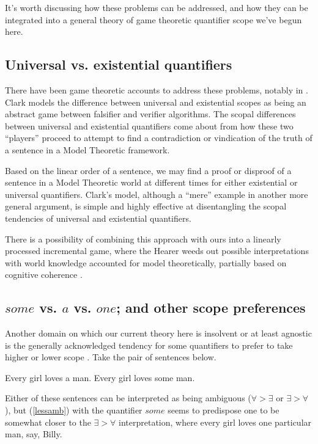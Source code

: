 \documentclass{article}
\begin{document}
It's worth discussing how these problems can be addressed, and how they can be integrated into a general theory of game theoretic quantifier scope we've begun here.

\subsection{Universal vs. existential quantifiers}

There have been game theoretic accounts to address these problems, notably in \textcite{clark12}.
Clark models the difference between universal and existential scopes as being an abstract game between falsifier and verifier algorithms.
The scopal differences between universal and existential quantifiers come about from how these two ``players'' proceed to attempt to find a contradiction or vindication of the truth of a sentence in a Model Theoretic framework.

Based on the linear order of a sentence, we may find a proof or disproof of a sentence in a Model Theoretic world at different times for either existential or universal quantifiers.
Clark's model, although a ``mere'' example in another more general argument, is simple and highly effective at disentangling the scopal tendencies of universal and existential quantifiers.

There is a possibility of combining this approach with ours into a linearly processed incremental game, where the Hearer weeds out possible interpretations with world knowledge accounted for model theoretically, partially based on cognitive coherence \parencite{langacker87}.

\subsection{$some$ vs. $a$ vs. $one$; and other scope preferences}\label{prefscope}

Another domain on which our current theory here is insolvent or at least agnostic is the generally acknowledged tendency for some quantifiers to prefer to take higher or lower scope \parencite{feiman16}. Take the pair of sentences below.

\begin{exe}
	\ex \begin{xlist}
	\ex Every girl loves a man.
	\ex Every girl loves some man.\label{lessamb}
	\end{xlist}
\end{exe}

Either of these sentences can be interpreted as being ambiguous (${\forall}>{\exists}$ or ${\exists}>{\forall}$), but (\ref{lessamb}) with the quantifier $some$ seems to predispose one to be somewhat closer to the ${\exists}>{\forall}$ interpretation, where every girl loves one particular man, say, Billy.
\end{document}
